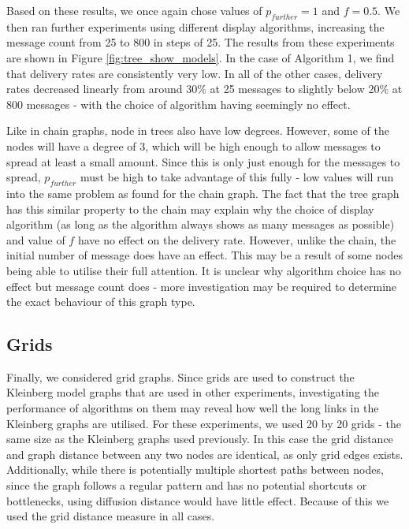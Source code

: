 \documentclass[bsc,frontabs,twoside,singlespacing,parskip,deptreport]{infthesis}     %
\begin{document}
Based on these results, we once again chose values of $p_{further}=1$ and $f=0.5$. We then ran further experiments using different display algorithms, increasing the message count from 25 to 800 in steps of 25. The results from these experiments are shown in Figure \ref{fig:tree_show_models}. In the case of Algorithm 1, we find that delivery rates are consistently very low. In all of the other cases, delivery rates decreased linearly from around 30\% at 25 messages to slightly below 20\% at 800 messages - with the choice of algorithm having seemingly no effect.

Like in chain graphs, node in trees also have low degrees. However, some of the nodes will have a degree of 3, which will be high enough to allow messages to spread at least a small amount. Since this is only just enough for the messages to spread, $p_{further}$ must be high to take advantage of this fully - low values will run into the same problem as found for the chain graph. The fact that the tree graph has this similar property to the chain may explain why the choice of display algorithm (as long as the algorithm always shows as many messages as possible) and value of $f$ have no effect on the delivery rate. However, unlike the chain, the initial number of message does have an effect. This may be a result of some nodes being able to utilise their full attention. It is unclear why algorithm choice has no effect but message count does - more investigation may be required to determine the exact behaviour of this graph type.


\subsection{Grids}
Finally, we considered grid graphs. Since grids are used to construct the Kleinberg model graphs that are used in other experiments, investigating the performance of algorithms on them may reveal how well the long links in the Kleinberg graphs are utilised. For these experiments, we used 20 by 20 grids - the same size as the Kleinberg graphs used previously. In this case the grid distance and graph distance between any two nodes are identical, as only grid edges exists. Additionally, while there is potentially multiple shortest paths between nodes, since the graph follows a regular pattern and has no potential shortcuts or bottlenecks, using diffusion distance would have little effect. Because of this we used the grid distance measure in all cases.
\end{document}
